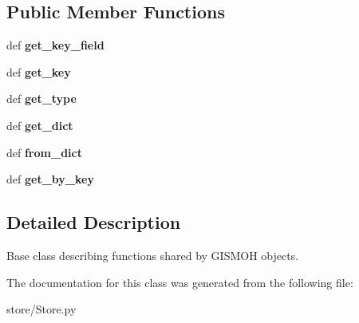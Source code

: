 \subsection*{Public Member Functions}
\begin{DoxyCompactItemize}
\item 
\hypertarget{classstore_1_1_store_1_1_g_i_s_m_o_h___object_a305ad901d8ba3d80d96e110f59100b45}{def {\bfseries get\-\_\-key\-\_\-field}}\label{classstore_1_1_store_1_1_g_i_s_m_o_h___object_a305ad901d8ba3d80d96e110f59100b45}

\item 
\hypertarget{classstore_1_1_store_1_1_g_i_s_m_o_h___object_ac3391d8ff49f41c4d90d8692fcf9ee8e}{def {\bfseries get\-\_\-key}}\label{classstore_1_1_store_1_1_g_i_s_m_o_h___object_ac3391d8ff49f41c4d90d8692fcf9ee8e}

\item 
\hypertarget{classstore_1_1_store_1_1_g_i_s_m_o_h___object_ab955e952f3fad2c1cc1909cf79bbfd25}{def {\bfseries get\-\_\-type}}\label{classstore_1_1_store_1_1_g_i_s_m_o_h___object_ab955e952f3fad2c1cc1909cf79bbfd25}

\item 
\hypertarget{classstore_1_1_store_1_1_g_i_s_m_o_h___object_a9b9e18740c48aedb2751ffbe62ca5f50}{def {\bfseries get\-\_\-dict}}\label{classstore_1_1_store_1_1_g_i_s_m_o_h___object_a9b9e18740c48aedb2751ffbe62ca5f50}

\item 
\hypertarget{classstore_1_1_store_1_1_g_i_s_m_o_h___object_a2e3683c267f623cd7740c7f47da42880}{def {\bfseries from\-\_\-dict}}\label{classstore_1_1_store_1_1_g_i_s_m_o_h___object_a2e3683c267f623cd7740c7f47da42880}

\item 
\hypertarget{classstore_1_1_store_1_1_g_i_s_m_o_h___object_a539e1c749f7900003ac845ec1f40c13d}{def {\bfseries get\-\_\-by\-\_\-key}}\label{classstore_1_1_store_1_1_g_i_s_m_o_h___object_a539e1c749f7900003ac845ec1f40c13d}

\end{DoxyCompactItemize}


\subsection{Detailed Description}
Base class describing functions shared by G\-I\-S\-M\-O\-H objects. 

The documentation for this class was generated from the following file\-:\begin{DoxyCompactItemize}
\item 
store/Store.\-py\end{DoxyCompactItemize}
